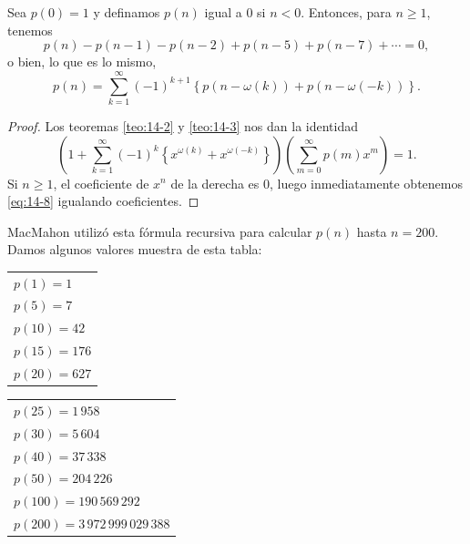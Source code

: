 \documentclass[12pt,a4paper]{book}
\begin{document}
    \begin{teorema}\label{teo:14-4}
        Sea $p(0)=1$ y definamos $p(n)$ igual a 0 si $n<0$. Entonces, para $n\geq1$, tenemos
        \begin{equation}\label{eq:14-8}
            p(n)-p(n-1)-p(n-2)+p(n-5)+p(n-7)+\cdots=0,
        \end{equation}
        o bien, lo que es lo mismo,
        \begin{equation*}
            p(n)=\sum_{k=1}^{\infty}(-1)^{k+1}\left\{p(n-\omega(k))+p(n-\omega(-k))\right\}.
        \end{equation*}
    \end{teorema}

    \begin{proof}
        Los teoremas \ref{teo:14-2} y \ref{teo:14-3} nos dan la identidad
        \begin{equation*}
            \left(1+\sum_{k=1}^{\infty}(-1)^{k}\left\{x^{\omega(k)}+x^{\omega(-k)}\right\}\right)\left(\sum_{m=0}^{\infty}p(m)x^{m}\right)=1.
        \end{equation*}
        Si $n\geq1$, el coeficiente de $x^{n}$ de la derecha es 0, luego inmediatamente
        obtenemos \eqref{eq:14-8} igualando coeficientes.
    \end{proof}

    MacMahon utilizó esta fórmula recursiva para calcular $p(n)$ hasta $n=200$. Damos algunos
    valores muestra de esta tabla:
    \begin{center}
        \begin{tabular}{@{}l@{}}
            $p(1)=1$\\
            $p(5)=7$\\
            $p(10)=42$\\
            $p(15)=176$\\
            $p(20)=627$
        \end{tabular}
    \end{center}

    \begin{center}
        \begin{tabular}{@{}l@{}}
            $p(25)=1\,958$\\
            $p(30)=5\,604$\\
            $p(40)=37\,338$\\
            $p(50)=204\,226$\\
            $p(100)=190\,569\,292$\\
            $p(200)=3\,972\,999\,029\,388$
        \end{tabular}
    \end{center}
\end{document}
